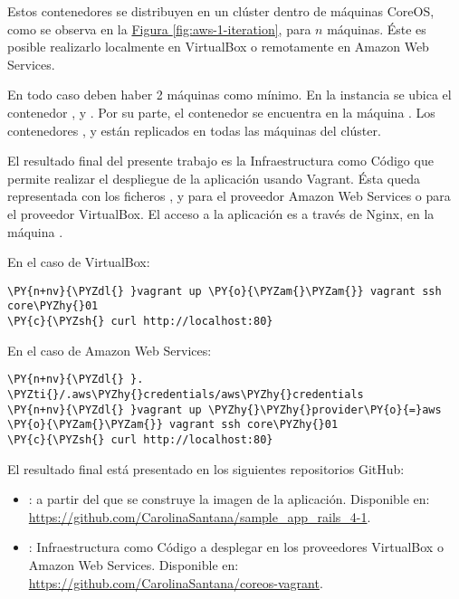 Estos contenedores se distribuyen en un clúster dentro de máquinas CoreOS, como se observa en la \hyperref[fig:aws-1-iteration]{Figura \ref{fig:aws-1-iteration}}, para $n$ máquinas. Éste es posible realizarlo localmente en VirtualBox o remotamente en Amazon Web Services. 

En todo caso deben haber 2 máquinas como mínimo. En la instancia  se ubica el contenedor ,  y . Por su parte, el contenedor  se encuentra en la máquina . Los contenedores ,  y  están replicados en todas las máquinas del clúster. 

El resultado final del presente trabajo es la Infraestructura como Código que permite realizar el despliegue de la aplicación usando Vagrant. Ésta queda representada con los ficheros ,  y  para el proveedor Amazon Web Services o  para el proveedor VirtualBox. El acceso a la aplicación es a través de Nginx, en la máquina .

En el caso de VirtualBox:

\begin{framed_shaded}
\begin{Verbatim}[fontsize=\relsize{-2.5},fontseries=b,commandchars=\\\{\}]
\PY{n+nv}{\PYZdl{} }vagrant up \PY{o}{\PYZam{}\PYZam{}} vagrant ssh core\PYZhy{}01
\PY{c}{\PYZsh{} curl http://localhost:80}
\end{Verbatim}
\end{framed_shaded}

En el caso de Amazon Web Services:

\begin{framed_shaded}
\begin{Verbatim}[fontsize=\relsize{-2.5},fontseries=b,commandchars=\\\{\}]
\PY{n+nv}{\PYZdl{} }. \PYZti{}/.aws\PYZhy{}credentials/aws\PYZhy{}credentials
\PY{n+nv}{\PYZdl{} }vagrant up \PYZhy{}\PYZhy{}provider\PY{o}{=}aws \PY{o}{\PYZam{}\PYZam{}} vagrant ssh core\PYZhy{}01
\PY{c}{\PYZsh{} curl http://localhost:80}
\end{Verbatim}
\end{framed_shaded}

El resultado final está presentado en los siguientes repositorios GitHub:
\begin{itemize}
\item {}: a partir del que se construye la imagen de la aplicación. Disponible en: \url{https://github.com/CarolinaSantana/sample_app_rails_4-1}.
\item {}: Infraestructura como Código a desplegar en los proveedores VirtualBox o Amazon Web Services. Disponible en: \url{https://github.com/CarolinaSantana/coreos-vagrant}.
\end{itemize}

